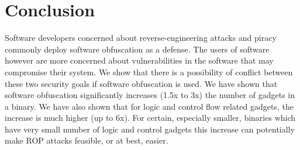 \section{Conclusion}
\label{sec:conc}

Software developers concerned about reverse-engineering attacks and piracy 
commonly deploy software obfuscation as a defense. The users of software 
however are more concerned about vulnerabilities in the software that may 
compromise their system. We show that there is a possibility of conflict 
between these two security goals if software obfuscation is used. We have 
shown that software obfuscation significantly increases (1.5x to 3x) the 
number of gadgets in a binary. We have also shown that for logic and control 
flow related gadgets, the increase is much higher (up to 6x). For certain, 
especially smaller, binaries which have very small number of logic and control 
gadgets this increase can potentially make ROP attacks feasible, or at best, 
easier. 
